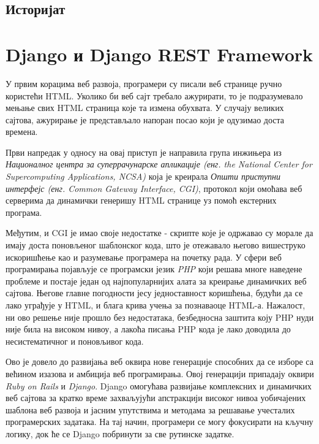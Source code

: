 \documentclass[12pt,oneside]{memoir}
\begin{document}



\section{Историјат}


\chapter{Django и Django REST Framework}

У првим корацима веб развоја, програмери су писали веб странице ручно користећи HTML. Уколико би веб сајт требало ажурирати,
то је подразумевало мењање свих HTML страница које та измена обухвата. У случају великих сајтова, ажурирање је представљало 
напоран посао који је одузимао доста времена.

Први напредак у односу на овај приступ је направила група инжињера из \textit{Националног центра за суперрачунарске апликације 
(енг. the National Center for Supercomputing Applications, NCSA)} која је креирала \textit{Општи приступни интерфејс 
(енг. Common Gateway Interface, CGI)}, протокол који омоћава веб серверима да динамички генеришу HTML странице уз помоћ екстерних програма. 

Међутим, и CGI је имао своје недостатке - скрипте које је одржавао су морале да имају доста поновљеног шаблонског кода,
што је отежавало његово вишеструко искоришћење као и разумевање програмера на почетку рада.
У сфери веб програмирања појављује се програмски језик \textit{PHP} који решава многе наведене проблеме и постаје један од најпопуларнијих алата за креирање динамичких веб сајтова. Његове главне погодности јесу једноставност коришћења, будући да се лако уграђује у HTML, и блага крива учења за познаваоце HTML-а. Нажалост, ни ово решење није прошло без недостатака, безбедносна заштита коју PHP нуди није била на високом нивоу, а лакоћа писања PHP кода је лако доводила до несистематичног и поновљивог кода.

Ово је довело до развијања веб оквира нове генерације способних да се изборе са 
већином изазова и амбиција веб програмирања. Овој генерацији припадају оквири \textit{Ruby
on Rails} и \textit{Django}. Django омогућава развијање комплексних и динамичких веб сајтова за кратко време захваљујући апстракцији високог нивоа уобичајених шаблона веб развоја и јасним упутствима и методама за решавање учесталих програмерских задатака. На тај начин, програмери се могу фокусирати на кључну логику, док ће се Django побринути за све рутинске задатке. \cite{GuideToDjango}
\end{document}
